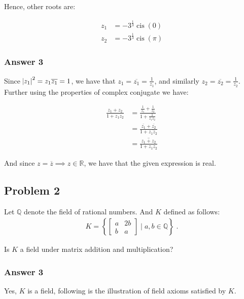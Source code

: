 \documentclass[11pt]{article}
\DeclareMathOperator{\cis}{cis}
\begin{document}
Hence, other roots are:

\begin{align*}
  z_1 &= -3^{\frac{1}{3}}\cis(0) \\
  z_2 &= -3^{\frac{1}{3}}\cis(\pi)
\end{align*}

\subsubsection{Answer 3}
\label{sec-1-1-2}
Since $\abs{z_1}^2 = z_1 \overline{z_1} = 1$, we have that $z_1 =
    \overline{z_1} = \frac{1}{z_1}$, and similarly $z_2 = \overline{z_2} =
    \frac{1}{z_2}$.  Further using the properties of complex conjugate we have:

\begin{align*}
  \frac{z_1 + z_2}{1 + z_1z_2} &= \frac{\frac{1}{z_1} + \frac{1}{z_2}}{1 + \frac{1}{z_1z_2}} \\
                               &= \frac{\overline{z_1} + \overline{z_2}}{1 + \overline{z_1z_2}} \\
                               &= \overline{\frac{z_1 + z_2}{1 + z_1z_2}}
\end{align*}

And since $z = \overline{z} \implies z \in \mathbb{R}$, we have that the given
expression is real.

\subsection{Problem 2}
\label{sec-1-2}
Let $\mathbb{Q}$ denote the field of rational numbers.  And $K$ defined as follows:
\begin{align*}
K = \left\{\begin{bmatrix}
      a & 2b \\
      b & a
    \end{bmatrix} \;|\; a,b \in \mathbb{Q}\right\}\;.
\end{align*}

Is $K$ a field under matrix addition and multiplication?

\subsubsection{Answer 3}
\label{sec-1-2-1}
Yes, $K$ is a field, following is the illustration of field axioms satisfied
by $K$.
\end{document}
